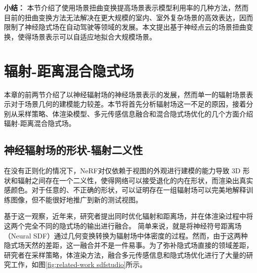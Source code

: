 \noindent\textbf{小结：}
本节介绍了使用场景扭曲变换提高场景表示模型利用率的几种方法，然而目前的扭曲变换方法无法解决在更大规模的室内、室外复杂场景的高效表达，因而限制了神经隐式场在自动驾驶等领域的发展。本文提出基于神经点云的场景扭曲变换，使得场景表示可以自适应地拟合大规模场景。


\newpage
\section{辐射-距离混合隐式场}
\label{sec: related-work density-distance fields}
本章的前两节介绍了以神经辐射场的神经场景表示的发展，然而单一的辐射场景表示对于场景几何的建模能力较差。本节将首先分析辐射场这一不足的原因，接着分别从采样策略、体渲染模型、多元传感信息融合和混合隐式场优化的几个方面介绍辐射-距离混合隐式场。

\subsection{神经辐射场的形状-辐射二义性}
\label{sec: related-work shape-radiance ambiguity}
在没有正则化的情况下，NeRF\cite{mildenhall_nerf_2020}对仅依赖于视图的外观进行建模的能力导致 3D 形状和辐射之间存在一个二义性，使得网络可以接受退化的内在形状，而渲染出真实感颜色。对于任意的、不正确的形状，可以证明存在一组辐射场可以完美地解释训练图像，但不能很好地推广到新的测试视图。

基于这一观察，近年来，研究者提出同时优化辐射和距离场，并在体渲染过程中将这两个完全不同的隐式场的输出进行融合\cite{oechsle_unisurf_2021,gropp_implicit_2020,yariv_multiview_2020,yariv_volume_2021,wang_neus_2021,shao_doublefield_2022,darmon_improving_2022,ueda_neural_2022,long_sparseneus_2022,yu_monosdf_2022,wang_pet-neus_2023,yuan_monocular_2023,liang_hr-neus_2023,chen_dehazenerf_2023,zhu_vdn-nerf_2023,azinovic_neural_2022, sun_neural_2022}。 简单来说，就是将神经符号距离场（Neural SDF）通过几何变换转换为辐射场中体密度的过程。然而，由于这两种隐式场天然的差距，这一融合并不是一件易事。为了弥补隐式场直接的领域差距，研究者在采样策略\cite{yariv_volume_2021, mildenhall_nerf_2020, barron_mip-nerf_2022, oechsle_unisurf_2021}，体渲染方法\cite{oechsle_unisurf_2021,yariv_volume_2021,wang_neus_2021}，融合多元传感信息\cite{azinovic_neural_2022,yu_monosdf_2022}和隐式场优化进行了大量的研究工作，如图\ref{fig:related-work sdfstudio}所示\cite{yu_sdfstudio_2022}。


